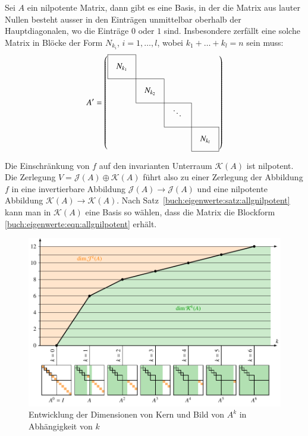 \begin{satz}
\label{buch:eigenwerte:satz:allgnilpotent}
Sei $A$ ein nilpotente Matrix, dann gibt es eine Basis, in der die Matrix
aus lauter Nullen besteht ausser in den Einträgen unmittelbar oberhalb der 
Hauptdiagonalen, wo die Einträge $0$ oder $1$ sind.
Insbesondere zerfällt eine solche Matrix in Blöcke der Form $N_{k_i}$,
$i=1,\dots,l$,
wobei $k_1+\dots+k_l=n$ sein muss:
\begin{equation}
\def\temp#1{\multicolumn{1}{|c}{\raisebox{0pt}[17pt][12pt]{\phantom{x}$#1\mathstrut$}\phantom{x}}}
A'
=\left(
\begin{array}{cccc}
\cline{1-1}
\temp{N_{k_1}} &\multicolumn{1}{|c}{}&        &           \\
\cline{1-2}
          &\temp{N_{k_2}}&\multicolumn{1}{|c}{}&           \\
\cline{2-3}
          &           &\temp{\ddots}&\multicolumn{1}{|c}{}\\
\cline{3-4}
          &           &        &\multicolumn{1}{|c|}{\raisebox{0pt}[17pt][12pt]{\phantom{x}$N_{k_l}$}\phantom{x}}\\
\cline{4-4}
\end{array}
\right)
\label{buch:eigenwerte:eqn:allgnilpotent}
\end{equation}
\end{satz}

Die Einschränkung von $f$ auf den invarianten Unterraum $\mathcal{K}(A)$
ist nilpotent.
Die Zerlegung $V=\mathcal{J}(A)\oplus \mathcal{K}(A)$ führt also zu einer
Zerlegung der Abbildung $f$ in eine invertierbare Abbildung
$\mathcal{J}(A)\to\mathcal{J}(A)$ und eine
nilpotente Abbildung $\mathcal{K}(A)\to\mathcal{K}(A)$.
Nach Satz~\ref{buch:eigenwerte:satz:allgnilpotent} kann man in
$\mathcal{K}(A)$ eine Basis so wählen, dass die Matrix die Blockform
\eqref{buch:eigenwerte:eqn:allgnilpotent} erhält.



\begin{figure}
\centering
\includegraphics[width=\textwidth]{chapters/40-eigenwerte/images/jknilp.pdf}
\caption{Entwicklung der Dimensionen von Kern und Bild von $A^k$ in
Abhängigkeit von $k$
\label{buch:eigenwte:fig:jknilp}}
\end{figure}

